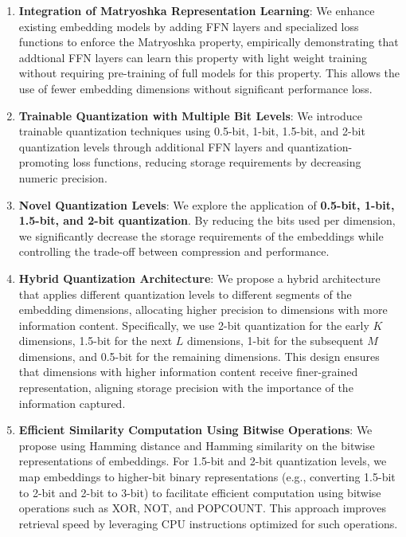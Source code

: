 \documentclass[acmtog, authorversion]{acmart}
\begin{document}
\begin{enumerate}  
    \item \textbf{Integration of Matryoshka Representation Learning}: We enhance existing embedding models by adding FFN layers and specialized loss functions to enforce the Matryoshka property, empirically demonstrating that addtional FFN layers can learn this property with light weight training without requiring pre-training of full models for this property. This allows the use of fewer embedding dimensions without significant performance loss.
  
    \item \textbf{Trainable Quantization with Multiple Bit Levels}: We introduce trainable quantization techniques using 0.5-bit, 1-bit, 1.5-bit, and 2-bit quantization levels through additional FFN layers and quantization-promoting loss functions, reducing storage requirements by decreasing numeric precision.  
  
    \item \textbf{Novel Quantization Levels}: We explore the application of \textbf{0.5-bit, 1-bit, 1.5-bit, and 2-bit quantization}. By reducing the bits used per dimension, we significantly decrease the storage requirements of the embeddings while controlling the trade-off between compression and performance.  
  
    \item \textbf{Hybrid Quantization Architecture}: We propose a hybrid architecture that applies different quantization levels to different segments of the embedding dimensions, allocating higher precision to dimensions with more information content. Specifically, we use 2-bit quantization for the early \( K \) dimensions, 1.5-bit for the next \( L \) dimensions, 1-bit for the subsequent \( M \) dimensions, and 0.5-bit for the remaining dimensions. This design ensures that dimensions with higher information content receive finer-grained representation, aligning storage precision with the importance of the information captured.
  
    \item \textbf{Efficient Similarity Computation Using Bitwise Operations}: We propose using Hamming distance and Hamming similarity on the bitwise representations of embeddings. For 1.5-bit and 2-bit quantization levels, we map embeddings to higher-bit binary representations (e.g., converting 1.5-bit to 2-bit and 2-bit to 3-bit) to facilitate efficient computation using bitwise operations such as XOR, NOT, and POPCOUNT. This approach improves retrieval speed by leveraging CPU instructions optimized for such operations.  
  
  
\end{enumerate}  
\end{document}
